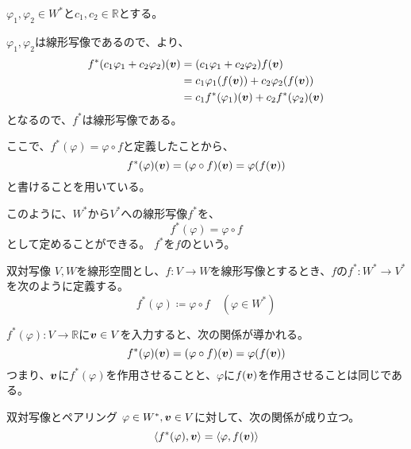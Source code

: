 \documentclass[../../../topic_linear-algebra]{subfiles}
\begin{document}
\begin{handout}[補足：$f^*$の線形性]
  $\varphi_1, \varphi_2 \in W^*$と$c_1, c_2 \in \mathbb{R}$とする。
  
  $\varphi_1, \varphi_2$は線形写像であるので、より、
  \begin{align*}
    f^*(c_1 \varphi_1 + c_2 \varphi_2)(\vb*{v}) &= (c_1 \varphi_1 + c_2 \varphi_2)f(\vb*{v}) \\
    &= c_1 \varphi_1(f(\vb*{v})) + c_2 \varphi_2(f(\vb*{v})) \\
    &= c_1 f^*(\varphi_1)(\vb*{v}) + c_2 f^*(\varphi_2)(\vb*{v})
  \end{align*}
  となるので、$f^*$は線形写像である。
  
  \br
  
  ここで、$f^*(\varphi) = \varphi \circ f$と定義したことから、
  \begin{equation*}
    f^*(\varphi)(\vb*{v}) = (\varphi \circ f)(\vb*{v}) = \varphi(f(\vb*{v}))
  \end{equation*}
  と書けることを用いている。
\end{handout}

このように、$W^*$から$V^*$への線形写像$f^*$を、
\begin{equation*}
  f^*(\varphi) = \varphi \circ f
\end{equation*}
として定めることができる。
$f^*$を$f$のという。

\begin{definition*}{双対写像}
  $V,W$を線形空間とし、$f \colon V \to W$を線形写像とするとき、$f$の$f^* \colon W^* \to V^*$を次のように定義する。
  \begin{equation*}
    f^*(\varphi) \coloneq \varphi \circ f \quad (\varphi \in W^*)
  \end{equation*}
\end{definition*}

$f^*(\varphi)\colon V \to \mathbb{R}$に$\vb*{v} \in V$を入力すると、次の関係が導かれる。
\begin{equation*}
  f^*(\varphi)(\vb*{v}) = (\varphi \circ f)(\vb*{v}) = \varphi(f(\vb*{v}))
\end{equation*}
つまり、$\vb*{v}$に$f^*(\varphi)$を作用させることと、$\varphi$に$f(\vb*{v})$を作用させることは同じである。

\begin{theorem*}{双対写像とペアリング}
  $\varphi \in W^*, \vb*{v} \in V$に対して、次の関係が成り立つ。
  \begin{equation*}
    \langle f^*(\varphi), \vb*{v} \rangle = \langle \varphi, f(\vb*{v}) \rangle
  \end{equation*}
\end{theorem*}
\end{document}
